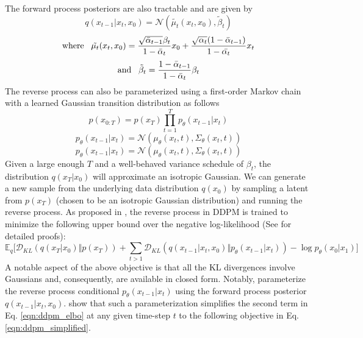 \documentclass[10pt]{article} \usepackage[accepted]{tmlr}
\begin{document}
The forward process posteriors are also tractable and are given by
\begin{equation}
    q(x_{t-1}|x_t,x_0) = \mathcal{N}(\tilde{\mu_t}(x_t, x_0), \tilde{\beta}_t)
\end{equation}
\begin{equation}
    \textnormal{where} \;\;\;\tilde{\mu_t}(x_t, x_0) = \frac{\sqrt{\bar{\alpha}_{t-1}}\beta_t}{1 - \bar{\alpha}_t}x_0 + \frac{\sqrt{\alpha_t}(1 - \bar{\alpha}_{t-1})}{1 - \bar{\alpha_t}}x_t
\end{equation}
\begin{equation}
    \textnormal{and} \;\;\; \tilde{\beta}_t = \frac{1 - \bar{\alpha}_{t-1}}{1 - \bar{\alpha}_t}\beta_t
    \label{eqn:for2}
\end{equation}
The reverse process  can also be parameterized using a first-order Markov chain with a learned Gaussian transition distribution as follows
\begin{equation}
    p(x_{0:T}) = p(x_T)\prod_{t=1}^T p_{\theta}(x_{t-1}|x_t)
\end{equation}
\begin{equation}
    p_{\theta}(x_{t-1}|x_t) = \mathcal{N}(\mu_{\theta}(x_t, t), \Sigma_{\theta}(x_t, t))
\end{equation}
\begin{equation}
    p_{\theta}(x_{t-1}|x_t) = \mathcal{N}(\mu_{\theta}(x_t, t), \Sigma_{\theta}(x_t, t))
\end{equation}
Given a large enough $T$ and a well-behaved variance schedule of $\beta_t$, the distribution $q(x_T|x_0)$ will approximate an isotropic Gaussian. We can generate a new sample from the underlying data distribution $q(x_0)$ by sampling a latent from $p(x_T)$ (chosen to be an isotropic Gaussian distribution) and running the reverse process.
As proposed in \citep{ho2020denoising}, the reverse process in DDPM is trained to minimize the following upper bound over the negative log-likelihood (See \citep{sohldickstein2015deep} for detailed proofs):
\begin{equation}
    \mathbb{E}_q\Bigg[\mathcal{D}_{KL}(q(x_T|x_0) \Vert p(x_T)) + \sum_{t>1}\mathcal{D}_{KL}(q(x_{t-1}|x_t, x_0) \Vert p_{\theta}(x_{t-1}|x_t)) - \log{p_{\theta}(x_0|x_1)}\Bigg]
\label{eqn:ddpm_elbo}
\end{equation}
A notable aspect of the above objective is that all the KL divergences involve Gaussians and, consequently, are available in closed form. Notably, \citep{ho2020denoising} parameterize the reverse process conditional $p_{\theta}(x_{t-1}|x_t)$ using the forward process posterior $q(x_{t-1}|x_t, x_0)$. \citep{ho2020denoising} show that such a parameterization simplifies the second term in Eq. \ref{eqn:ddpm_elbo} at any given time-step $t$ to the following objective in Eq. \ref{eqn:ddpm_simplified}.
\end{document}
